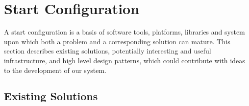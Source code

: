 
\section{Start Configuration}
\label{sec:start_configuration}


A start configuration is a basis of software tools, platforms, libraries and system upon which both a problem and a corresponding solution can mature. This section describes existing solutions, potentially interesting and useful infrastructure, and high level design patterns, which could contribute with ideas to the development of our system.

\subsection{Existing Solutions}
\label{sub:existing_solutions}

